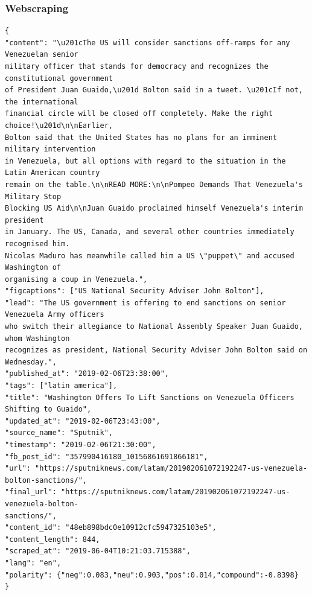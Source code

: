 \begin{frame}[fragile]
 \frametitle{Webscraping}
 \tiny
 \begin{verbatim}
{
"content": "\u201cThe US will consider sanctions off-ramps for any Venezuelan senior 
military officer that stands for democracy and recognizes the constitutional government 
of President Juan Guaido,\u201d Bolton said in a tweet. \u201cIf not, the international 
financial circle will be closed off completely. Make the right choice!\u201d\n\nEarlier,
Bolton said that the United States has no plans for an imminent military intervention
in Venezuela, but all options with regard to the situation in the Latin American country
remain on the table.\n\nREAD MORE:\n\nPompeo Demands That Venezuela's Military Stop
Blocking US Aid\n\nJuan Guaido proclaimed himself Venezuela's interim president
in January. The US, Canada, and several other countries immediately recognised him.
Nicolas Maduro has meanwhile called him a US \"puppet\" and accused Washington of
organising a coup in Venezuela.",
"figcaptions": ["US National Security Adviser John Bolton"],
"lead": "The US government is offering to end sanctions on senior Venezuela Army officers
who switch their allegiance to National Assembly Speaker Juan Guaido, whom Washington
recognizes as president, National Security Adviser John Bolton said on Wednesday.",
"published_at": "2019-02-06T23:38:00", 
"tags": ["latin america"], 
"title": "Washington Offers To Lift Sanctions on Venezuela Officers Shifting to Guaido", 
"updated_at": "2019-02-06T23:43:00", 
"source_name": "Sputnik", 
"timestamp": "2019-02-06T21:30:00", 
"fb_post_id": "357990416180_10156861691866181", 
"url": "https://sputniknews.com/latam/201902061072192247-us-venezuela-bolton-sanctions/",
"final_url": "https://sputniknews.com/latam/201902061072192247-us-venezuela-bolton-
sanctions/",
"content_id": "48eb898bdc0e10912cfc5947325103e5",
"content_length": 844, 
"scraped_at": "2019-06-04T10:21:03.715388", 
"lang": "en", 
"polarity": {"neg":0.083,"neu":0.903,"pos":0.014,"compound":-0.8398}
}
 \end{verbatim}
\end{frame}
